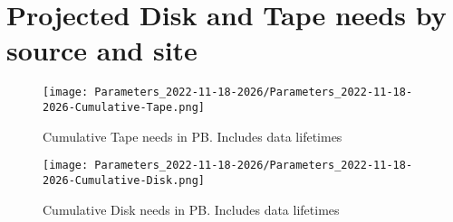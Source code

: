 \section{Projected Disk and Tape needs by source and site}
\begin{figure}[h]
\centering\texttt{[image: Parameters\_2022-11-18-2026/Parameters\_2022-11-18-2026-Cumulative-Tape.png]}
\caption{Cumulative Tape needs in PB. Includes data lifetimes}
\label{fig:Cumulative-Tape}
\end{figure}
\begin{figure}[h]
\centering\texttt{[image: Parameters\_2022-11-18-2026/Parameters\_2022-11-18-2026-Cumulative-Disk.png]}
\caption{Cumulative Disk needs in PB. Includes data lifetimes}
\label{fig:Cumulative-Disk}
\end{figure}
